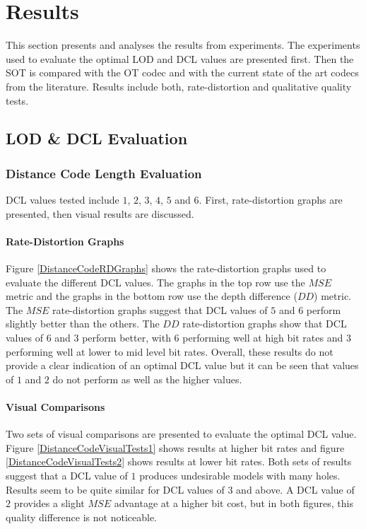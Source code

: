 \section{Results}

This section presents and analyses the results from experiments. The experiments used to evaluate the optimal LOD and DCL values are presented first. Then the SOT is compared with the OT codec and with the current state of the art codecs from the literature. Results include both, rate-distortion and qualitative quality tests. 

\subsection{LOD \& DCL Evaluation}

\subsubsection{Distance Code Length Evaluation}

DCL values tested include $1$, $2$, $3$, $4$, $5$ and $6$. First, rate-distortion graphs are presented, then visual results are discussed.

\paragraph{Rate-Distortion Graphs}

Figure \ref{DistanceCodeRDGraphs} shows the rate-distortion graphs used to evaluate the different DCL values. The graphs in the top row use the $MSE$ metric and the graphs in the bottom row use the depth difference ($DD$) metric. The $MSE$ rate-distortion graphs suggest that DCL values of $5$ and $6$ perform slightly better than the others. The $DD$ rate-distortion graphs show that DCL values of $6$ and $3$ perform better, with $6$ performing well at high bit rates and $3$ performing well at lower to mid level bit rates. Overall, these results do not provide a clear indication of an optimal DCL value but it can be seen that values of $1$ and $2$ do not perform as well as the higher values.


\paragraph{Visual Comparisons}


Two sets of visual comparisons are presented to evaluate the optimal DCL value. Figure \ref{DistanceCodeVisualTests1} shows results at higher bit rates and figure \ref{DistanceCodeVisualTests2} shows results at lower bit rates. Both sets of results suggest that a DCL value of $1$ produces undesirable models with many holes. Results seem to be quite similar for DCL values of $3$ and above. A DCL value of $2$ provides a slight $MSE$ advantage at a higher bit cost, but in both figures, this quality difference is not noticeable.


